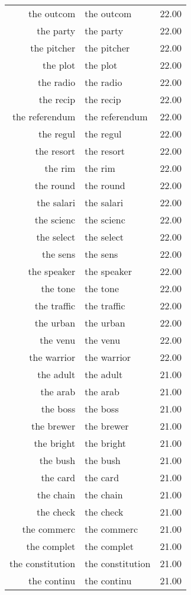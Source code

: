 \begin{table}[ht]
\begin{tabular}{rlr}
  the outcom & the outcom & 22.00 \\ 
  the party & the party & 22.00 \\ 
  the pitcher & the pitcher & 22.00 \\ 
  the plot & the plot & 22.00 \\ 
  the radio & the radio & 22.00 \\ 
  the recip & the recip & 22.00 \\ 
  the referendum & the referendum & 22.00 \\ 
  the regul & the regul & 22.00 \\ 
  the resort & the resort & 22.00 \\ 
  the rim & the rim & 22.00 \\ 
  the round & the round & 22.00 \\ 
  the salari & the salari & 22.00 \\ 
  the scienc & the scienc & 22.00 \\ 
  the select & the select & 22.00 \\ 
  the sens & the sens & 22.00 \\ 
  the speaker & the speaker & 22.00 \\ 
  the tone & the tone & 22.00 \\ 
  the traffic & the traffic & 22.00 \\ 
  the urban & the urban & 22.00 \\ 
  the venu & the venu & 22.00 \\ 
  the warrior & the warrior & 22.00 \\ 
  the adult & the adult & 21.00 \\ 
  the arab & the arab & 21.00 \\ 
  the boss & the boss & 21.00 \\ 
  the brewer & the brewer & 21.00 \\ 
  the bright & the bright & 21.00 \\ 
  the bush & the bush & 21.00 \\ 
  the card & the card & 21.00 \\ 
  the chain & the chain & 21.00 \\ 
  the check & the check & 21.00 \\ 
  the commerc & the commerc & 21.00 \\ 
  the complet & the complet & 21.00 \\ 
  the constitution & the constitution & 21.00 \\ 
  the continu & the continu & 21.00 \\ 

\end{tabular}
\end{table}
